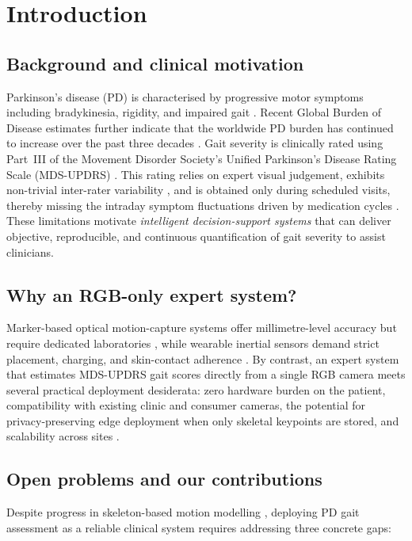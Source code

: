 \documentclass[preprint,12pt]{elsarticle}
\begin{document}
\section{Introduction}
\label{sec:intro}

\subsection{Background and clinical motivation}
Parkinson's disease (PD) is characterised by progressive motor symptoms
including bradykinesia, rigidity, and impaired gait \cite{poewe2017parkinson}.
Recent Global Burden of Disease estimates further indicate that the worldwide
PD burden has continued to increase over the past three decades
\cite{yang2026gbd}.
Gait severity is clinically rated using Part~III of the Movement Disorder
Society's Unified Parkinson's Disease Rating Scale (MDS-UPDRS)
\cite{goetz2008mds}. This rating relies on expert visual judgement,
exhibits non-trivial inter-rater variability \cite{richards1994inter}, and
is obtained only during scheduled visits, thereby missing the intraday
symptom fluctuations driven by medication cycles \cite{zhang2024wearable}.
These limitations motivate \emph{intelligent decision-support systems} that
can deliver objective, reproducible, and continuous quantification of gait
severity to assist clinicians.

\subsection{Why an RGB-only expert system?}
Marker-based optical motion-capture systems offer millimetre-level accuracy
but require dedicated laboratories \cite{dibiase2020gait}, while wearable
inertial sensors demand strict placement, charging, and skin-contact
adherence \cite{zhang2024wearable}. By contrast, an expert system that
estimates MDS-UPDRS gait scores directly from a single RGB camera meets
several practical deployment desiderata: zero hardware burden on the patient,
compatibility with existing clinic and consumer cameras, the potential for
privacy-preserving edge deployment when only skeletal keypoints are stored,
and scalability across sites \cite{sun2024digital}.

\subsection{Open problems and our contributions}
Despite progress in skeleton-based motion modelling
\cite{shi2019twoStream,zhu2023motionbert}, deploying PD gait assessment as a
reliable clinical system requires addressing three concrete gaps:
\end{document}
